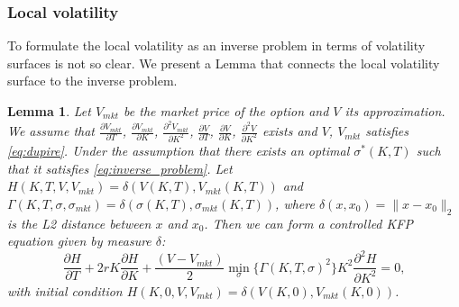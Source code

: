 \documentclass{article}
\theoremstyle{plain}%
\newtheorem{lemma}[theorem]{Lemma}
\theoremstyle{definition}
\theoremstyle{remark}
\begin{document}
\subsubsection{Local volatility}
To formulate the local volatility as an inverse problem in terms of volatility surfaces is not so clear. We present a Lemma that connects the local volatility surface to the inverse problem.
\begin{lemma}
Let $V_{mkt}$ be the market price of the option and $V$ its approximation. We assume that $\frac{\partial V_{mkt}}{\partial T}$, $\frac{\partial V_{mkt}}{\partial K}$, $\frac{\partial^2 V_{mkt}}{\partial K^2}$, $\frac{\partial V}{\partial T}$, $\frac{\partial V}{\partial K}$, $\frac{\partial^2 V}{\partial K^2}$ exists and $V$, $V_{mkt}$ satisfies \eqref{eq:dupire}. Under the assumption that there exists an optimal $\sigma^*(K,T)$ such that it satisfies \eqref{eq:inverse_problem}. Let $H(K,T,V,V_{mkt}) = \delta(V(K,T),V_{mkt}(K,T))$ and $\Gamma(K,T,\sigma,\sigma_{mkt}) = \delta(\sigma(K,T),\sigma_{mkt}(K,T))$, where $\delta(x,x_0) = \|x-x_0\|_2$ is the L2 distance between $x$ and $x_0$. Then we can form a controlled KFP equation given by measure $\delta$:
\begin{equation}
    \frac{\partial H}{\partial T}+2rK\frac{\partial H}{\partial K} +\frac{(V-V_{mkt})}{2}\min_{\sigma}\{\Gamma(K,T,\sigma)^2\}K^2\frac{\partial^2 H}{\partial K^2} = 0,
    \label{eq:kfp}
\end{equation}
with initial condition $H(K,0,V,V_{mkt}) = \delta(V(K,0),V_{mkt}(K,0))$. 
\end{lemma}
\end{document}
